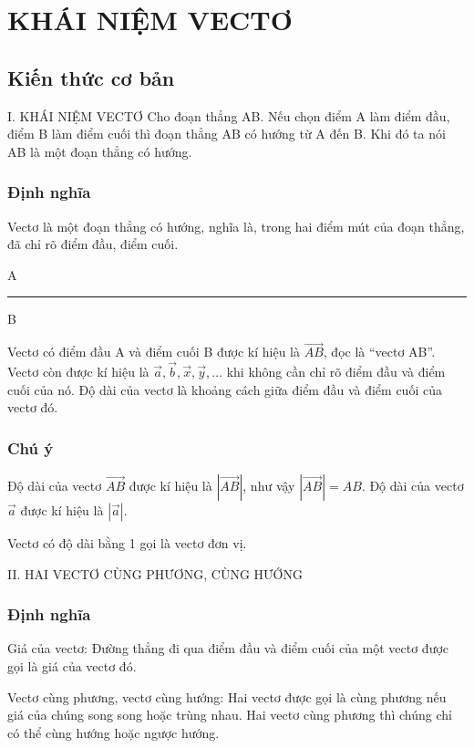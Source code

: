 \chapter{KHÁI NIỆM VECTƠ}

\section{Kiến thức cơ bản}

I. KHÁI NIỆM VECTƠ
Cho đoạn thẳng AB. Nếu chọn điểm A làm điểm đầu, điểm B làm điểm cuối thì đoạn thẳng AB có hướng từ A đến B. Khi đó ta nói AB là một đoạn thẳng có hướng.

\subsection{Định nghĩa}
\begin{dn}
    Vectơ là một đoạn thẳng có hướng, nghĩa là, trong hai điểm mút của đoạn thẳng, đã chỉ rõ điểm đầu, điểm cuối.
    \begin{center}
        A \quad \rule{2cm}{0.5pt} \quad B
    \end{center}
    Vectơ có điểm đầu A và điểm cuối B được kí hiệu là $\vec{AB}$, đọc là “vectơ AB”.
    Vectơ còn được kí hiệu là $\vec{a}, \vec{b}, \vec{x}, \vec{y}, \dots$ khi không cần chỉ rõ điểm đầu và điểm cuối của nó.
    Độ dài của vectơ là khoảng cách giữa điểm đầu và điểm cuối của vectơ đó.
\end{dn}

\subsection{Chú ý}
\begin{note}
    Độ dài của vectơ $\vec{AB}$ được kí hiệu là $|\vec{AB}|$, như vậy $|\vec{AB}| = AB$. Độ dài của vectơ $\vec{a}$ được kí hiệu là $|\vec{a}|$.
\end{note}
Vectơ có độ dài bằng 1 gọi là vectơ đơn vị.

II. HAI VECTƠ CÙNG PHƯƠNG, CÙNG HƯỚNG
\subsection{Định nghĩa}
\begin{dn}
    Giá của vectơ: Đường thẳng đi qua điểm đầu và điểm cuối của một vectơ được gọi là giá của vectơ đó.

    Vectơ cùng phương, vectơ cùng hướng: Hai vectơ được gọi là cùng phương nếu giá của chúng song song hoặc trùng nhau.
    Hai vectơ cùng phương thì chúng chỉ có thể cùng hướng hoặc ngược hướng.
\end{dn}

